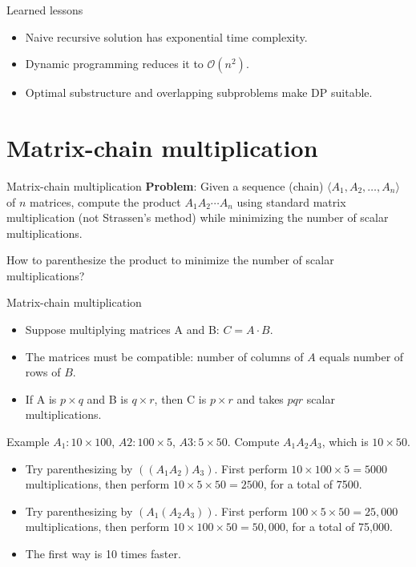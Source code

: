 \documentclass[aspectratio=169]{beamer}
\begin{document}
\begin{frame}{Learned lessons}
    \begin{itemize}
        \item Naive recursive solution has exponential time complexity.
        \item Dynamic programming reduces it to $\mathcal{O}(n^2)$.
        \item Optimal substructure and overlapping subproblems make DP suitable.
    \end{itemize}
\end{frame}

\section{Matrix-chain multiplication}

\begin{frame}{Matrix-chain multiplication}
    \textbf{Problem}: Given a sequence (chain) $\langle A_1, A_2, \ldots, A_n\rangle$ of $n$ matrices, compute the product $A_1 A_2 \cdots A_n$ using standard matrix multiplication (not Strassen's method) while minimizing the number of scalar multiplications.

    \begin{alertblock}{}
        How to parenthesize the product to minimize the number of scalar multiplications?
    \end{alertblock}
\end{frame}

\begin{frame}{Matrix-chain multiplication}
    \begin{itemize}
        \item Suppose multiplying matrices A and B: $C = A \cdot B$.
        \item The matrices must be compatible: number of columns of $A$ equals number of rows of $B$.
        \item If A is $p \times q$ and B is $q \times r$, then C is $p \times r$ and takes $pqr$ scalar multiplications.
    \end{itemize}
\end{frame}

\begin{frame}{Example}
    $A_1: 10 \times 100$, $A2: 100 \times 5$, $A3: 5 \times 50$. Compute $A_1 A_2 A_3$, which is $10 \times 50$.
    \begin{itemize}
        \item Try parenthesizing by $((A_1 A_2) A_3)$. First perform $10 \times 100 \times 5 = 5000$ multiplications, then perform $10 \times 5 \times 50 = 2500$, for a total of 7500.
        \item Try parenthesizing by $(A_1 (A_2 A_3))$. First perform $100 \times 5 \times 50 = 25,000$ multiplications, then perform $10 \times 100 \times 50 = 50,000$, for a total of 75,000.
        \item The ﬁrst way is 10 times faster.
    \end{itemize}
\end{frame}
\end{document}
